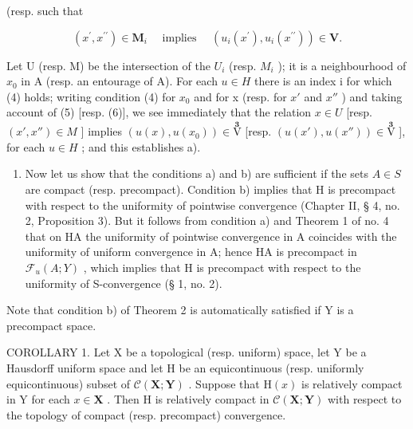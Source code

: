 (resp. such that

\[
(x ^ {\prime}, x ^ {\prime \prime}) \in \mathbf {M} _ {i} \quad \text { implies } \quad (u _ {i} (x ^ {\prime}), u _ {i} (x ^ {\prime \prime})) \in \mathbf {V}.\tag{6}
\]

Let U (resp. M) be the intersection of the \(U_{i}\) (resp. \(M_{i}\) ); it is a neighbourhood of \(x_{0}\) in A (resp. an entourage of A). For each \(u \in H\) there is an index i for which (4) holds; writing condition (4) for \(x_{0}\) and for x (resp. for \(x'\) and \(x''\) ) and taking account of (5) {[}resp. (6){]}, we see immediately that the relation \(x \in U\) {[}resp. \((x', x'') \in M\) {]} implies \((u(x), u(x_{0})) \in \overset{\mathbf{3}}{\mathrm{V}}\) {[}resp. \((u(x'), u(x'')) \in \overset{\mathbf{3}}{\mathrm{V}}\) {]}, for each \(u \in H\) ; and this establishes a).

\begin{enumerate}
\def\labelenumi{\arabic{enumi})}
\setcounter{enumi}{1}
\tightlist
\item
  Now let us show that the conditions a) and b) are sufficient if the sets \(A \in S\) are compact (resp. precompact). Condition b) implies that H is precompact with respect to the uniformity of pointwise convergence (Chapter II, § 4, no. 2, Proposition 3). But it follows from condition a) and Theorem 1 of no. 4 that on H\textbar A the uniformity of pointwise convergence in A coincides with the uniformity of uniform convergence in A; hence H\textbar A is precompact in \(\mathcal{F}_{u}(A; Y)\) , which implies that H is precompact with respect to the uniformity of S-convergence (§ 1, no. 2).
\end{enumerate}

Note that condition b) of Theorem 2 is automatically satisfied if Y is a precompact space.

COROLLARY 1. Let X be a topological (resp. uniform) space, let Y be a Hausdorff uniform space and let H be an equicontinuous (resp. uniformly equicontinuous) subset of \(\mathcal{C}(\mathbf{X};\mathbf{Y})\) . Suppose that \(\mathrm{H}(x)\) is relatively compact in Y for each \(x\in \mathbf{X}\) . Then H is relatively compact in \(\mathcal{C}(\mathbf{X};\mathbf{Y})\) with respect to the topology of compact (resp. precompact) convergence.

